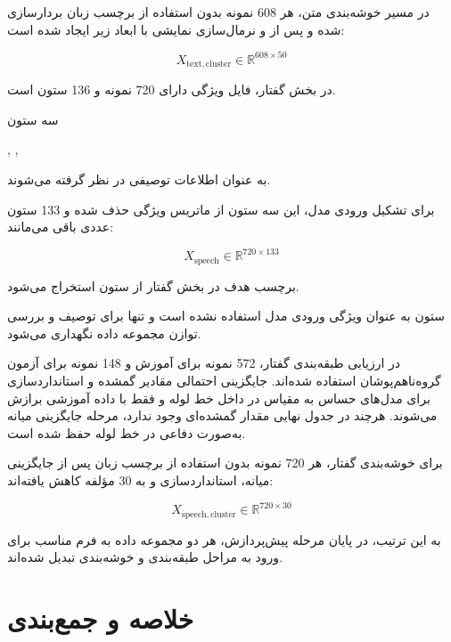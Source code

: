 \documentclass[12pt,a4paper,oneside]{report}
\begin{document}
در مسیر خوشه‌بندی متن، هر 608 نمونه بدون استفاده از برچسب زبان بردارسازی شده و پس از
و نرمال‌سازی
نمایشی با ابعاد زیر ایجاد شده است:

\begin{equation}
X_{\mathrm{text,cluster}}
\in
\mathbb{R}^{608\times50}
\end{equation}

در بخش گفتار، فایل ویژگی دارای 720 نمونه و 136 ستون است.

سه ستون

\begin{center}
,
\quad
{},
\quad
{}
\end{center}

به عنوان اطلاعات توصیفی در نظر گرفته می‌شوند.

برای تشکیل ورودی مدل، این سه ستون از ماتریس ویژگی حذف شده و 133 ستون عددی باقی می‌مانند:

\begin{equation}
X_{\mathrm{speech}}
\in
\mathbb{R}^{720\times133}
\end{equation}

برچسب هدف در بخش گفتار از ستون
استخراج می‌شود.

ستون
به عنوان ویژگی ورودی مدل استفاده نشده است و تنها برای توصیف و بررسی توازن مجموعه داده نگهداری می‌شود.

در ارزیابی طبقه‌بندی گفتار، 572 نمونه برای آموزش و 148 نمونه برای آزمون گروه‌ناهم‌پوشان استفاده شده‌اند. جایگزینی احتمالی مقادیر گمشده و استانداردسازی برای مدل‌های حساس به مقیاس در داخل خط لوله و فقط با داده آموزشی برازش می‌شوند. هرچند در جدول نهایی مقدار گمشده‌ای وجود ندارد، مرحله جایگزینی میانه به‌صورت دفاعی در خط لوله حفظ شده است.

برای خوشه‌بندی گفتار، هر 720 نمونه بدون استفاده از برچسب زبان پس از جایگزینی میانه، استانداردسازی و
به 30 مؤلفه کاهش یافته‌اند:

\begin{equation}
X_{\mathrm{speech,cluster}}
\in
\mathbb{R}^{720\times30}
\end{equation}

به این ترتیب، در پایان مرحله پیش‌پردازش، هر دو مجموعه داده به فرم مناسب برای ورود به مراحل طبقه‌بندی و خوشه‌بندی تبدیل شده‌اند.


\section{خلاصه و جمع‌بندی}
\end{document}

